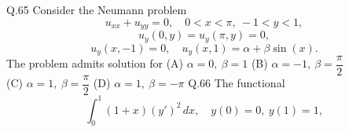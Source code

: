 \documentclass{article}
\begin{document}
																																																																																																									   Q.65 \quad Consider the Neumann problem
																																																																																																									   \[
																																																																																																									   u_{xx} + u_{yy} = 0,\quad 0 < x < \pi,\ -1 < y < 1,
																																																																																																									   \]
																																																																																																									   \[
																																																																																																									   u_y(0, y) = u_y(\pi, y) = 0,
																																																																																																									   \]
																																																																																																									   \[
																																																																																																									   u_y(x, -1) = 0,\quad u_y(x, 1) = \alpha + \beta \sin(x).
																																																																																																									   \]
																																																																																																									   The problem admits solution for
																																																																																																									   \newline
																																																																																																									   (A) $\alpha = 0,\ \beta = 1$ \hspace{2cm} (B) $\alpha = -1,\ \beta = \dfrac{\pi}{2}$ \hspace{2cm} \\ (C) $\alpha = 1,\ \beta = \dfrac{\pi}{2}$ \hspace{2cm} (D) $\alpha = 1,\ \beta = -\pi$
																																																																																																									   \vspace{1em} \newline
																																																																																																									   Q.66 \quad The functional
																																																																																																									   \[
																																																																																																									   \int_0^1 (1+x)(y')^2 \, dx,\quad y(0) = 0,\ y(1) = 1,
																																																																																																									   \]
\end{document}
